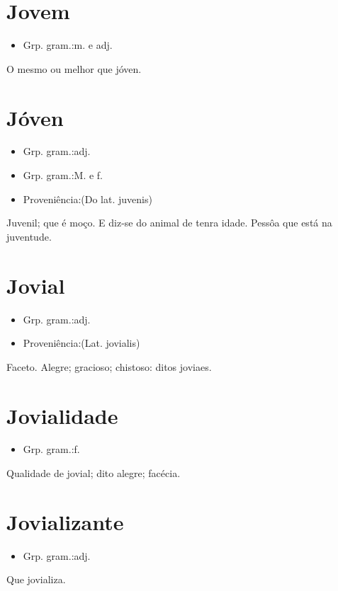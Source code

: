 \documentclass{article}
\begin{document}
\section{Jovem}
\begin{itemize}
\item {Grp. gram.:m.  e  adj.}
\end{itemize}
O mesmo ou melhor que \textunderscore jóven\textunderscore .
\section{Jóven}
\begin{itemize}
\item {Grp. gram.:adj.}
\end{itemize}
\begin{itemize}
\item {Grp. gram.:M.  e  f.}
\end{itemize}
\begin{itemize}
\item {Proveniência:(Do lat. \textunderscore juvenis\textunderscore )}
\end{itemize}
Juvenil; que é moço.
E diz-se do animal de tenra idade.
Pessôa que está na juventude.
\section{Jovial}
\begin{itemize}
\item {Grp. gram.:adj.}
\end{itemize}
\begin{itemize}
\item {Proveniência:(Lat. \textunderscore jovialis\textunderscore )}
\end{itemize}
Faceto.
Alegre; gracioso; chistoso: \textunderscore ditos joviaes\textunderscore .
\section{Jovialidade}
\begin{itemize}
\item {Grp. gram.:f.}
\end{itemize}
Qualidade de jovial; dito alegre; facécia.
\section{Jovializante}
\begin{itemize}
\item {Grp. gram.:adj.}
\end{itemize}
Que jovializa.
\end{document}

